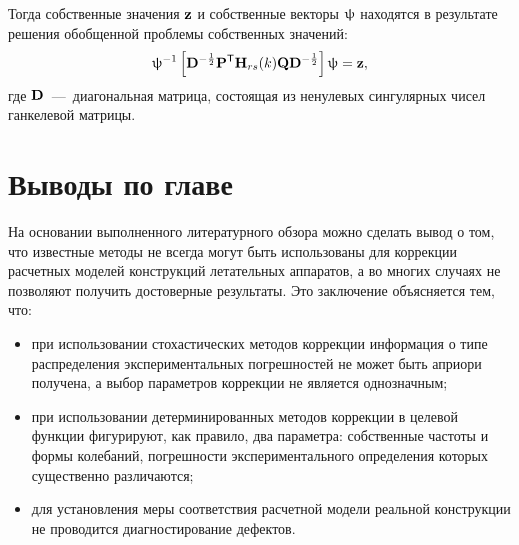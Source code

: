 Тогда собственные значения $ \mathbf{z} $ и собственные векторы $ \mathbf{\uppsi} $ находятся в результате решения обобщенной проблемы собственных значений:
\begin{equation}
	\mathbf{\uppsi} ^ {-1} \left[ \mathbf{D} ^ {-\frac{1}{2}} \mathbf{P} ^ \mathsf{T} \mathbf{H}_{rs}(k) \mathbf{Q} \mathbf{D} ^ {-\frac{1}{2}} \right] \uppsi = \mathbf{z},
\end{equation}
где $ \mathbf{D} $~---~диагональная матрица, состоящая из ненулевых сингулярных чисел ганкелевой матрицы.

\section{Выводы по главе \thechapter}

На основании выполненного литературного обзора можно сделать вывод о том, что известные методы не всегда могут быть использованы для коррекции расчетных моделей конструкций летательных аппаратов, а во многих случаях не позволяют получить достоверные результаты. Это заключение объясняется тем, что:
\begin{itemize}
	\item при использовании стохастических методов коррекции информация о типе распределения экспериментальных погрешностей не может быть априори получена, а выбор параметров коррекции не является однозначным;
	\item при использовании детерминированных методов коррекции в целевой функции фигурируют, как правило, два параметра: собственные частоты и формы колебаний, погрешности экспериментального определения которых существенно различаются;
	\item для установления меры соответствия расчетной модели реальной конструкции не проводится диагностирование дефектов. 
\end{itemize}